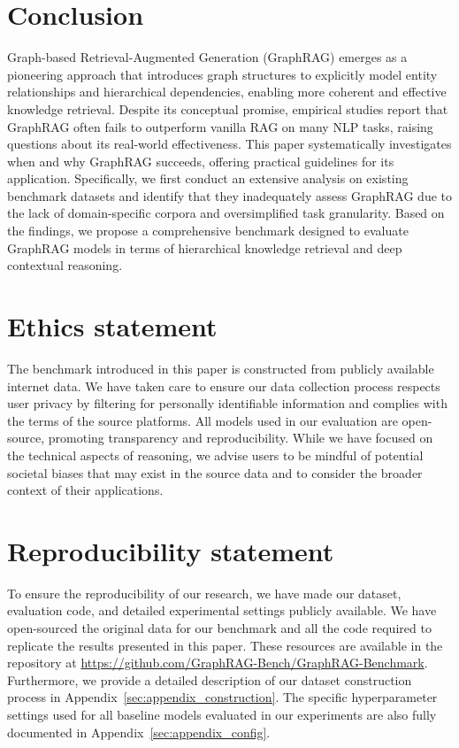 \documentclass{article} %
\begin{document}
\section{Conclusion}
Graph-based Retrieval-Augmented Generation (GraphRAG) emerges as a pioneering approach that introduces graph structures to explicitly model entity relationships and hierarchical dependencies, enabling more coherent and effective knowledge retrieval. Despite its conceptual promise, empirical studies report that GraphRAG often fails to outperform vanilla RAG on many NLP tasks, raising questions about its real-world effectiveness. This paper systematically investigates when and why GraphRAG succeeds, offering practical guidelines for its application. Specifically, we first conduct an extensive analysis on existing benchmark datasets and identify that they inadequately assess GraphRAG due to the lack of domain-specific corpora and oversimplified task granularity. Based on the findings, we propose a comprehensive benchmark designed to evaluate GraphRAG models in terms of hierarchical knowledge retrieval and deep contextual reasoning. 

\section*{Ethics statement}
The benchmark introduced in this paper is constructed from publicly available internet data. We have taken care to ensure our data collection process respects user privacy by filtering for personally identifiable information and complies with the terms of the source platforms. All models used in our evaluation are open-source, promoting transparency and reproducibility. While we have focused on the technical aspects of reasoning, we advise users to be mindful of potential societal biases that may exist in the source data and to consider the broader context of their applications.

\section*{Reproducibility statement}
To ensure the reproducibility of our research, we have made our dataset, evaluation code, and detailed experimental settings publicly available. We have open-sourced the original data for our benchmark and all the code required to replicate the results presented in this paper. These resources are available in the repository at \url{https://github.com/GraphRAG-Bench/GraphRAG-Benchmark}. Furthermore, we provide a detailed description of our dataset construction process in Appendix~\ref{sec:appendix_construction}. The specific hyperparameter settings used for all baseline models evaluated in our experiments are also fully documented in Appendix~\ref{sec:appendix_config}.
\end{document}
